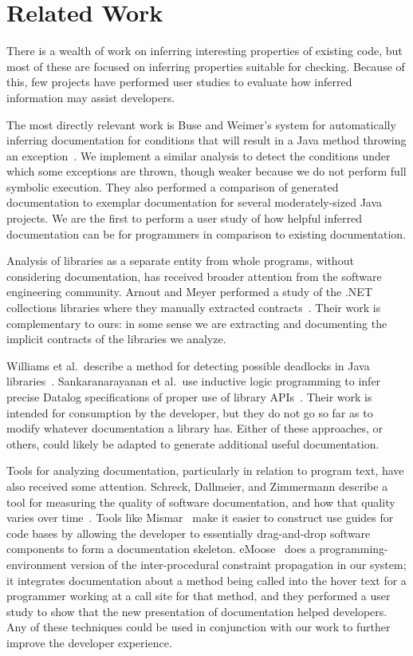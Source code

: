 \section{Related Work}
There is a wealth of work on inferring interesting properties of existing code,
but most of these are focused on inferring properties suitable for checking.
Because of this, few projects have performed user studies to evaluate how
inferred information may assist developers.

The most directly relevant work is Buse and Weimer's system for automatically
inferring documentation for conditions that will result in a Java method
throwing an exception~\cite{autodoc}.  We implement a similar analysis
to detect the conditions under which some exceptions are thrown, though weaker
because we do not perform full symbolic execution.  They also performed a
comparison of generated documentation to exemplar documentation for several
moderately-sized Java projects.  We are the first to perform a user study of how
helpful inferred documentation can be for programmers in comparison to existing
documentation.

Analysis of libraries as a separate entity from whole programs, without
considering documentation, has received broader attention from the software
engineering community.  Arnout and Meyer performed a study of the .NET
collections libraries where they manually extracted
contracts~\cite{findingcontracts}.  Their work is complementary to ours: in some
sense we are extracting and documenting the implicit contracts of the libraries
we analyze.

Williams et al.~describe a method for detecting possible deadlocks in Java
libraries~\cite{deadlocklibs}.  Sankaranarayanan et al.~use inductive logic
programming to infer precise Datalog specifications of proper use of library
APIs~\cite{mininglibspecs}.  Their work is intended for consumption by the
developer, but they do not go so far as to modify whatever documentation a
library has.  Either of these approaches, or others, could likely be adapted to
generate additional useful documentation.

Tools for analyzing documentation, particularly in relation to program text,
have also received some attention.  Schreck, Dallmeier, and Zimmermann describe
a tool for measuring the quality of software documentation, and how that
quality varies over time~\cite{evolvedoc}. Tools like Mismar~\cite{mismar} make
it easier to construct use guides for code bases by allowing the developer to
essentially drag-and-drop software components to form a documentation skeleton.
eMoose~\cite{emoose} does a programming-environment version of the
inter-procedural constraint propagation in our system; it integrates
documentation about a method being called into the hover text for a programmer
working at a call site for that method, and they performed a user study to show
that the new presentation of documentation helped developers.  Any of these techniques could be used
in conjunction with our work to further improve the developer experience.

